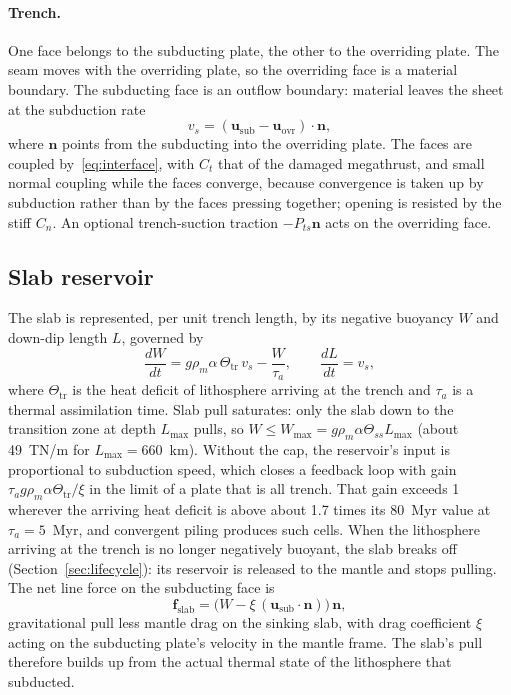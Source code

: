 \documentclass[11pt]{article}
\newcommand{\vect}[1]{\mathbf{#1}}
\begin{document}
\paragraph{Trench.} One face belongs to the subducting plate, the other to the overriding plate. The seam moves with the overriding plate, so the overriding face is a material boundary. The subducting face is an outflow boundary: material leaves the sheet at the subduction rate
\begin{equation}
  v_s = (\vect{u}_{\mathrm{sub}}-\vect{u}_{\mathrm{ovr}})\cdot\vect{n},
\end{equation}
where $\vect{n}$ points from the subducting into the overriding plate. The faces are coupled by~\eqref{eq:interface}, with $C_t$ that of the damaged megathrust, and small normal coupling while the faces converge, because convergence is taken up by subduction rather than by the faces pressing together; opening is resisted by the stiff $C_n$. An optional trench-suction traction $-P_{ts}\vect{n}$ acts on the overriding face.

\subsection{Slab reservoir}
\label{sec:slabmodel}
The slab is represented, per unit trench length, by its negative buoyancy $W$ and down-dip length $L$, governed by
\begin{equation}
  \frac{dW}{dt} = g\rho_m\alpha\,\Theta_{\mathrm{tr}}\,v_s - \frac{W}{\tau_a},
  \qquad \frac{dL}{dt} = v_s ,
  \label{eq:slab}
\end{equation}
where $\Theta_{\mathrm{tr}}$ is the heat deficit of lithosphere arriving at the trench and $\tau_a$ is a thermal assimilation time. Slab pull saturates: only the slab down to the transition zone at depth $L_{\max}$ pulls, so $W\le W_{\max}=g\rho_m\alpha\Theta_{ss}L_{\max}$ (about 49~TN/m for $L_{\max}=660$~km). Without the cap, the reservoir's input is proportional to subduction speed, which closes a feedback loop with gain $\tau_ag\rho_m\alpha\Theta_{\mathrm{tr}}/\xi$ in the limit of a plate that is all trench. That gain exceeds 1 wherever the arriving heat deficit is above about 1.7 times its 80~Myr value at $\tau_a=5$~Myr, and convergent piling produces such cells. When the lithosphere arriving at the trench is no longer negatively buoyant, the slab breaks off (Section~\ref{sec:lifecycle}): its reservoir is released to the mantle and stops pulling. The net line force on the subducting face is
\begin{equation}
  \vect{f}_{\mathrm{slab}} = \big(W - \xi\,(\vect{u}_{\mathrm{sub}}\cdot\vect{n})\big)\,\vect{n},
  \label{eq:slabforce}
\end{equation}
gravitational pull less mantle drag on the sinking slab, with drag coefficient $\xi$ acting on the subducting plate's velocity in the mantle frame. The slab's pull therefore builds up from the actual thermal state of the lithosphere that subducted.
\end{document}
